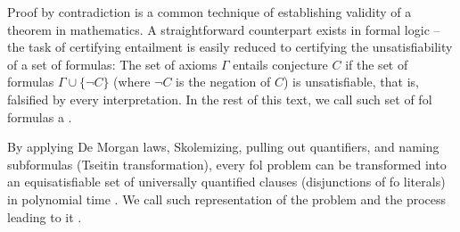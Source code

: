
Proof by contradiction is a common technique of establishing validity of a theorem in mathematics.
A straightforward counterpart exists in formal logic --
the task of certifying
entailment is easily reduced to
certifying the
unsatisfiability of a set of formulas:
The set of axioms $\Gamma$ entails conjecture $C$ if the set of formulas $\Gamma \cup \{\lnot C\}$ (where $\lnot C$ is the negation of $C$) is unsatisfiable, that is, falsified by every interpretation.
In the rest of this text, we call such set of \gls{fol} formulas a .


By applying
De Morgan laws,
Skolemizing,
pulling out quantifiers, and
naming subformulas (Tseitin transformation),
every \gls{fol} problem can be transformed into an equisatisfiable set of universally quantified clauses (disjunctions of \gls{fo} literals) in polynomial time \cite{DBLP:books/el/RV01/NonnengartW01}.
We call such representation of the problem 
and the process leading to it .

